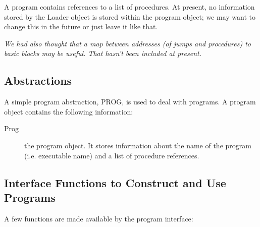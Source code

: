 A program contains references to a list of procedures. 
At present, no information stored by the Loader object is
stored within the program object; we may want to change this
in the future or just leave it like that.   

{\it We had also thought that a map between addresses (of jumps
and procedures) to basic blocks may be useful.  That hasn't been
included at present. }


\subsection{Abstractions} 
A simple program abstraction, PROG, is used to deal with 
programs.  A program object contains the following information:
\begin{description}
\item [Prog] the program object.  It stores information about
    the name of the program (i.e. executable name) and a list
    of procedure references.
\end{description}


\subsection{Interface Functions to Construct and Use Programs}
A few functions are made available by the program interface:

